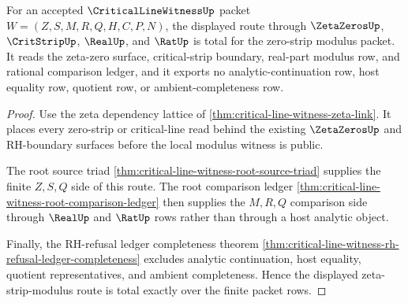 \begin{theorem}
\label{thm:critical-line-witness-zeta-strip-modulus-totality}
For an accepted $\CriticalLineWitnessUp$ packet $W=(Z,S,M,R,Q,H,C,P,N)$, the displayed route through $\ZetaZerosUp$, $\CritStripUp$, $\RealUp$, and $\RatUp$ is total for the zero-strip modulus packet. It reads the zeta-zero surface, critical-strip boundary, real-part modulus row, and rational comparison ledger, and it exports no analytic-continuation row, host equality row, quotient row, or ambient-completeness row.
\end{theorem}
\begin{proof}
Use the zeta dependency lattice of \autoref{thm:critical-line-witness-zeta-link}. It places every zero-strip or critical-line read behind the existing $\ZetaZerosUp$ and RH-boundary surfaces before the local modulus witness is public.

The root source triad \autoref{thm:critical-line-witness-root-source-triad} supplies the finite $Z,S,Q$ side of this route. The root comparison ledger \autoref{thm:critical-line-witness-root-comparison-ledger} then supplies the $M,R,Q$ comparison side through $\RealUp$ and $\RatUp$ rows rather than through a host analytic object.

Finally, the RH-refusal ledger completeness theorem \autoref{thm:critical-line-witness-rh-refusal-ledger-completeness} excludes analytic continuation, host equality, quotient representatives, and ambient completeness. Hence the displayed zeta-strip-modulus route is total exactly over the finite packet rows.
\end{proof}

